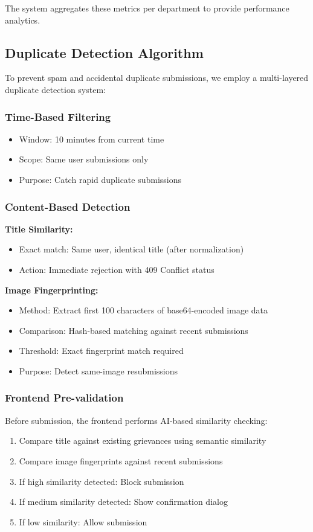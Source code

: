 \documentclass[12pt,a4paper]{article}
\begin{document}
The system aggregates these metrics per department to provide performance analytics.

\subsection{Duplicate Detection Algorithm}

To prevent spam and accidental duplicate submissions, we employ a multi-layered duplicate detection system:

\subsubsection{Time-Based Filtering}
\begin{itemize}
    \item Window: 10 minutes from current time
    \item Scope: Same user submissions only
    \item Purpose: Catch rapid duplicate submissions
\end{itemize}

\subsubsection{Content-Based Detection}

\textbf{Title Similarity:}
\begin{itemize}
    \item Exact match: Same user, identical title (after normalization)
    \item Action: Immediate rejection with 409 Conflict status
\end{itemize}

\textbf{Image Fingerprinting:}
\begin{itemize}
    \item Method: Extract first 100 characters of base64-encoded image data
    \item Comparison: Hash-based matching against recent submissions
    \item Threshold: Exact fingerprint match required
    \item Purpose: Detect same-image resubmissions
\end{itemize}

\subsubsection{Frontend Pre-validation}

Before submission, the frontend performs AI-based similarity checking:
\begin{enumerate}
    \item Compare title against existing grievances using semantic similarity
    \item Compare image fingerprints against recent submissions
    \item If high similarity detected: Block submission
    \item If medium similarity detected: Show confirmation dialog
    \item If low similarity: Allow submission
\end{enumerate}
\end{document}

